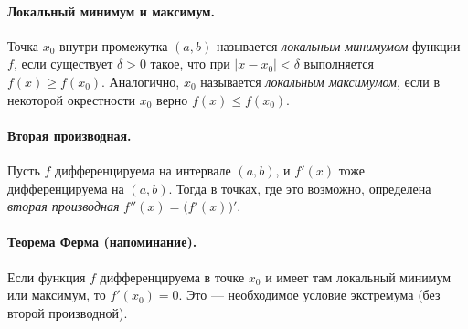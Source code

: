 
\paragraph{Локальный минимум и максимум.}
Точка $x_0$ внутри промежутка $(a,b)$ называется \emph{локальным минимумом} функции $f$,
если существует $\delta>0$ такое, что при $|x - x_0| < \delta$
выполняется $f(x) \ge f(x_0)$.
Аналогично, $x_0$ называется \emph{локальным максимумом},
если в некоторой окрестности $x_0$ верно $f(x) \le f(x_0)$.

\bigskip

\paragraph{Вторая производная.}
Пусть $f$ дифференцируема на интервале $(a,b)$, и $f'(x)$ тоже дифференцируема на $(a,b)$.
Тогда в точках, где это возможно, определена \emph{вторая производная} $f''(x)=\bigl(f'(x)\bigr)'$.

\bigskip

\paragraph{Теорема Ферма (напоминание).}
Если функция $f$ дифференцируема в точке $x_0$ и имеет там локальный минимум или максимум,
то $f'(x_0)=0$.
Это — необходимое условие экстремума (без второй производной).
